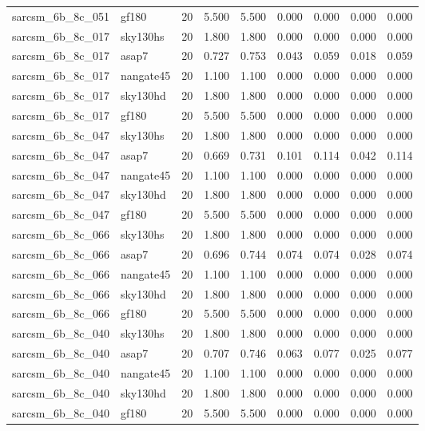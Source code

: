 \begin{tabular}{llrrrrrrr}
sarcsm\_6b\_8c\_051 & gf180 & 20 & 5.500 & 5.500 & 0.000 & 0.000 & 0.000 & 0.000 \\
sarcsm\_6b\_8c\_017 & sky130hs & 20 & 1.800 & 1.800 & 0.000 & 0.000 & 0.000 & 0.000 \\
sarcsm\_6b\_8c\_017 & asap7 & 20 & 0.727 & 0.753 & 0.043 & 0.059 & 0.018 & 0.059 \\
sarcsm\_6b\_8c\_017 & nangate45 & 20 & 1.100 & 1.100 & 0.000 & 0.000 & 0.000 & 0.000 \\
sarcsm\_6b\_8c\_017 & sky130hd & 20 & 1.800 & 1.800 & 0.000 & 0.000 & 0.000 & 0.000 \\
sarcsm\_6b\_8c\_017 & gf180 & 20 & 5.500 & 5.500 & 0.000 & 0.000 & 0.000 & 0.000 \\
sarcsm\_6b\_8c\_047 & sky130hs & 20 & 1.800 & 1.800 & 0.000 & 0.000 & 0.000 & 0.000 \\
sarcsm\_6b\_8c\_047 & asap7 & 20 & 0.669 & 0.731 & 0.101 & 0.114 & 0.042 & 0.114 \\
sarcsm\_6b\_8c\_047 & nangate45 & 20 & 1.100 & 1.100 & 0.000 & 0.000 & 0.000 & 0.000 \\
sarcsm\_6b\_8c\_047 & sky130hd & 20 & 1.800 & 1.800 & 0.000 & 0.000 & 0.000 & 0.000 \\
sarcsm\_6b\_8c\_047 & gf180 & 20 & 5.500 & 5.500 & 0.000 & 0.000 & 0.000 & 0.000 \\
sarcsm\_6b\_8c\_066 & sky130hs & 20 & 1.800 & 1.800 & 0.000 & 0.000 & 0.000 & 0.000 \\
sarcsm\_6b\_8c\_066 & asap7 & 20 & 0.696 & 0.744 & 0.074 & 0.074 & 0.028 & 0.074 \\
sarcsm\_6b\_8c\_066 & nangate45 & 20 & 1.100 & 1.100 & 0.000 & 0.000 & 0.000 & 0.000 \\
sarcsm\_6b\_8c\_066 & sky130hd & 20 & 1.800 & 1.800 & 0.000 & 0.000 & 0.000 & 0.000 \\
sarcsm\_6b\_8c\_066 & gf180 & 20 & 5.500 & 5.500 & 0.000 & 0.000 & 0.000 & 0.000 \\
sarcsm\_6b\_8c\_040 & sky130hs & 20 & 1.800 & 1.800 & 0.000 & 0.000 & 0.000 & 0.000 \\
sarcsm\_6b\_8c\_040 & asap7 & 20 & 0.707 & 0.746 & 0.063 & 0.077 & 0.025 & 0.077 \\
sarcsm\_6b\_8c\_040 & nangate45 & 20 & 1.100 & 1.100 & 0.000 & 0.000 & 0.000 & 0.000 \\
sarcsm\_6b\_8c\_040 & sky130hd & 20 & 1.800 & 1.800 & 0.000 & 0.000 & 0.000 & 0.000 \\
sarcsm\_6b\_8c\_040 & gf180 & 20 & 5.500 & 5.500 & 0.000 & 0.000 & 0.000 & 0.000 \\

\end{tabular}
